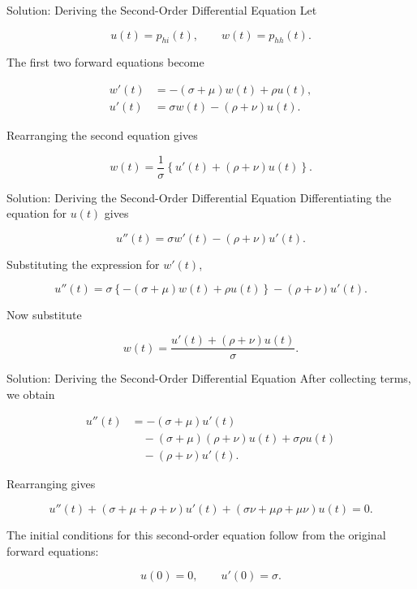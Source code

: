 \documentclass[
  ignorenonframetext,
  aspectratio=169,
]{beamer}
\begin{document}
\begin{frame}{Solution: Deriving the Second-Order Differential Equation}
\protect{}\label{solution-deriving-the-second-order-differential-equation}
Let

\[
u(t)=p_{hi}(t),
\qquad
w(t)=p_{hh}(t).
\]

The first two forward equations become

\[
\begin{aligned}
w'(t)
&=-(\sigma+\mu)w(t)+\rho u(t),\\
u'(t)
&=\sigma w(t)-(\rho+\nu)u(t).
\end{aligned}
\]

Rearranging the second equation gives

\[
w(t)=\frac{1}{\sigma}
\left\{u'(t)+(\rho+\nu)u(t)\right\}.
\]
\end{frame}

\begin{frame}{Solution: Deriving the Second-Order Differential Equation}
\protect{}\label{solution-deriving-the-second-order-differential-equation-1}
Differentiating the equation for \(u(t)\) gives

\[
u''(t)=\sigma w'(t)-(\rho+\nu)u'(t).
\]

Substituting the expression for \(w'(t)\),

\[
u''(t)
=
\sigma\left\{-(\sigma+\mu)w(t)+\rho u(t)\right\}
-(\rho+\nu)u'(t).
\]

Now substitute

\[
w(t)=\frac{u'(t)+(\rho+\nu)u(t)}{\sigma}.
\]
\end{frame}

\begin{frame}{Solution: Deriving the Second-Order Differential Equation}
\protect{}\label{solution-deriving-the-second-order-differential-equation-2}
After collecting terms, we obtain

\[
\begin{aligned}
u''(t)
&=-(\sigma+\mu)u'(t)\\
&\quad-(\sigma+\mu)(\rho+\nu)u(t)
+\sigma\rho u(t)\\
&\quad-(\rho+\nu)u'(t).
\end{aligned}
\]

Rearranging gives

\[
\boxed{
u''(t)
+(\sigma+\mu+\rho+\nu)u'(t)
+(\sigma\nu+\mu\rho+\mu\nu)u(t)=0.
}
\]

The initial conditions for this second-order equation follow from the
original forward equations:

\[
u(0)=0,
\qquad
u'(0)=\sigma.
\]
\end{frame}
\end{document}
